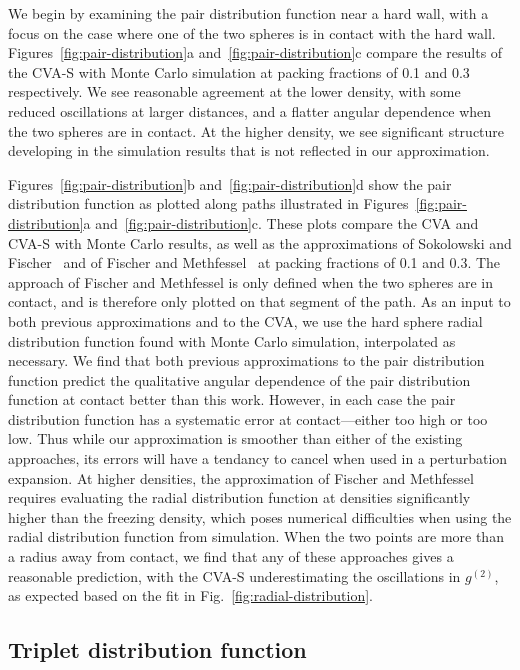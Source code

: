 \documentclass[letterpaper,twocolumn,amsmath,amssymb,pre,aps,10pt]{revtex4-1}
\begin{document}
We begin by examining the pair distribution function near a hard wall,
with a focus on the case where one of the two spheres is in contact
with the hard wall.  Figures~\ref{fig:pair-distribution}a
and~\ref{fig:pair-distribution}c compare the results of the CVA-S with
Monte Carlo simulation at packing fractions of 0.1 and 0.3
respectively. We see reasonable agreement at the lower density, with
some reduced oscillations at larger distances, and a flatter angular
dependence when the two spheres are in contact.  At the higher
density, we see significant structure developing in the simulation
results that is not reflected in our approximation.

Figures~\ref{fig:pair-distribution}b and~\ref{fig:pair-distribution}d
show the pair distribution function as plotted along paths illustrated
in Figures~\ref{fig:pair-distribution}a
and~\ref{fig:pair-distribution}c.  These plots compare the CVA and
CVA-S with Monte Carlo results, as well as the approximations of
Sokolowski and Fischer~\cite{sokolowski1992role} and of Fischer and
Methfessel~\cite{fischer1980born} at packing fractions of 0.1 and 0.3.
The approach of Fischer and Methfessel is only defined when the two
spheres are in contact, and is therefore only plotted on that segment
of the path.  As an input to both previous approximations and to the
CVA, we use the hard sphere radial distribution function found with
Monte Carlo simulation, interpolated as necessary. We find that both
previous approximations to the pair distribution function predict the
qualitative angular dependence of the pair distribution function at
contact better than this work.  However, in each case the pair
distribution function has a systematic error at contact---either too
high or too low.  Thus while our approximation is smoother than either
of the existing approaches, its errors will have a tendancy to cancel
when used in a perturbation expansion.  At higher densities, the
approximation of Fischer and Methfessel requires evaluating the radial
distribution function at densities significantly higher than the
freezing density, which poses numerical difficulties when using the
radial distribution function from simulation.  When the two points are
more than a radius away from contact, we find that any of these
approaches gives a reasonable prediction, with the CVA-S
underestimating the oscillations in $g^{(2)}$, as expected based on
the fit in Fig.~\ref{fig:radial-distribution}.

\subsection{Triplet distribution function}
\end{document}
